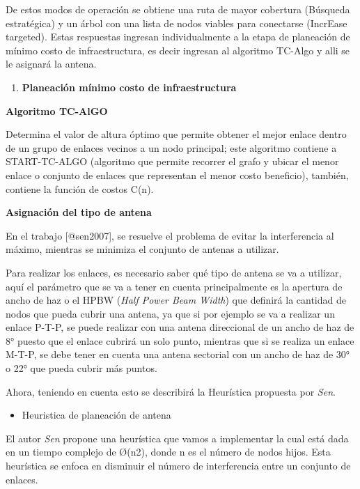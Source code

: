 \documentclass[]{article}
\providecommand{\tightlist}{%
  \setlength{\itemsep}{0pt}\setlength{\parskip}{0pt}}
\begin{document}
De estos modos de operación se obtiene una ruta de mayor cobertura
(Búsqueda estratégica) y un árbol con una lista de nodos viables para
conectarse (IncrEase targeted). Estas respuestas ingresan
individualmente a la etapa de planeación de mínimo costo de
infraestructura, es decir ingresan al algoritmo TC-Algo y alli se le
asignará la antena.

\begin{enumerate}
\def\labelenumi{\arabic{enumi}.}
\setcounter{enumi}{2}
\tightlist
\item
  \textbf{Planeación mínimo costo de infraestructura}
\end{enumerate}

\textbf{Algoritmo TC-AlGO}

Determina el valor de altura óptimo que permite obtener el mejor enlace
dentro de un grupo de enlaces vecinos a un nodo principal; este
algoritmo contiene a START-TC-ALGO (algoritmo que permite recorrer el
grafo y ubicar el menor enlace o conjunto de enlaces que representan el
menor costo beneficio), también, contiene la función de costos C(n).

\textbf{Asignación del tipo de antena}

En el trabajo {[}@sen2007{]}, se resuelve el problema de evitar la
interferencia al máximo, mientras se minimiza el conjunto de antenas a
utilizar.

Para realizar los enlaces, es necesario saber qué tipo de antena se va a
utilizar, aquí el parámetro que se va a tener en cuenta principalmente
es la apertura de ancho de haz o el HPBW (\emph{Half Power Beam Width})
que definirá la cantidad de nodos que pueda cubrir una antena, ya que si
por ejemplo se va a realizar un enlace P-T-P, se puede realizar con una
antena direccional de un ancho de haz de 8° puesto que el enlace cubrirá
un solo punto, mientras que si se realiza un enlace M-T-P, se debe tener
en cuenta una antena sectorial con un ancho de haz de 30° o 22° que
pueda cubrir más puntos.

Ahora, teniendo en cuenta esto se describirá la Heurística propuesta por
\emph{Sen}.

\begin{itemize}
\tightlist
\item
  Heuristica de planeación de antena
\end{itemize}

El autor \emph{Sen} propone una heurística que vamos a implementar la
cual está dada en un tiempo complejo de Ø(n2), donde n es el número de
nodos hijos. Esta heurística se enfoca en disminuir el número de
interferencia entre un conjunto de enlaces.
\end{document}
